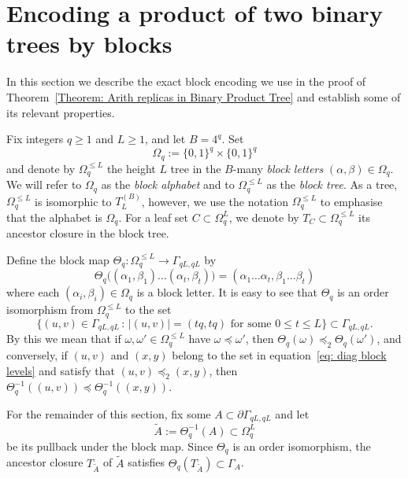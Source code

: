 \documentclass[11pt]{amsart}
\newcommand\labs[1]{\left\lvert#1\right\rvert}
\renewcommand{\leq}{\leqslant}
\renewcommand{\geq}{\geqslant}
\theoremstyle{plain}
\theoremstyle{definition}
\theoremstyle{remark}
\begin{document}
\section{Encoding a product of two binary trees by blocks}
In this section we describe the exact block encoding we use in the proof of Theorem~\ref{Theorem: Arith replicas in Binary Product Tree} and establish some of its relevant properties.


Fix integers $q\geq 1$ and $L\geq 1$, and let $B=4^q$. Set 
\[\Omega_q:= \{0,1\}^q \times \{0,1\}^q\]
and denote by $\Omega_q^{\leq L}$ the height $L$ tree in the $B$-many \textit{block letters} $(\alpha,\beta)\in \Omega_q$.  We will refer to $\Omega_q$ as the \textit{block alphabet} and to $\Omega_q^{\leq L}$ as the \textit{block tree}. As a tree, $\Omega_q^{\leq L}$ is isomorphic to $T_L^{(B)}$, however, we use the notation $\Omega_q^{\leq L}$ to emphasise that the alphabet is $\Omega_q$. For a leaf set $C \subset \Omega_q^L$, we denote by $T_C \subset \Omega_q^{\leq L}$ its ancestor closure in the block tree.

Define the block map $\Theta_q: \Omega_q^{\leq L} \to \Gamma_{qL,qL}$ by
\begin{equation}\label{eq: Block map formula}
\Theta_q\big( (\alpha_1,\beta_1)\ldots(\alpha_t,\beta_t)\big) = (\alpha_1 \ldots \alpha_t,\beta_1 \ldots \beta_t)
\end{equation}
where each $(\alpha_i,\beta_i) \in \Omega_q$ is a block letter. It is easy to see that $\Theta_q$ is an order isomorphism from $\Omega_q^{\leq L}$ to the set
\begin{equation}\label{eq: diag block levels}
\{(u,v) \in \Gamma_{qL,qL} \, : \, \labs{(u,v)} = (tq,tq) \text{ for some }0\leq t \leq L\}\subset \Gamma_{qL,qL}.
\end{equation}
By this we mean that if $\omega,\omega' \in \Omega_q^{\leq L}$ have $\omega \preceq \omega'$, then $\Theta_q(\omega)\preceq_2 \Theta_q(\omega')$, and conversely, if $(u,v)$ and $(x,y)$ belong to the set in equation~\eqref{eq: diag block levels} and satisfy that $(u,v) \preceq_2 (x,y)$, then $\Theta_q^{-1}((u,v)) \preceq \Theta_q^{-1}((x,y))$.

For the remainder of this section, fix some $A\subset \partial \Gamma_{qL,qL}$ and let
\[\tilde{A} := \Theta_q^{-1}(A)\subset  \Omega_{q}^L\]
be its pullback under the block map. Since $\Theta_q$ is an order isomorphism, the ancestor closure $T_{\tilde{A}}$ of $\tilde{A}$ satisfies $\Theta_q(T_{\tilde{A}}) \subset \Gamma_A$.
\end{document}
